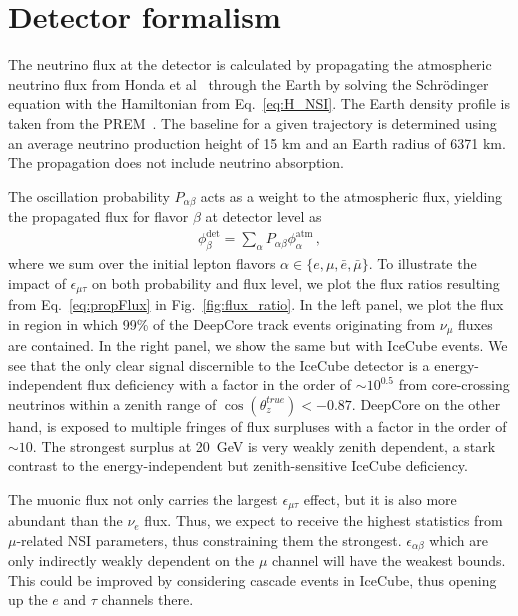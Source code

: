 \documentclass[draft=True]{revtex4-2}
\newcommand{\ztrue}{\ensuremath{\cos{(\theta_z^{true})}}}
\newcommand{\emt}{\ensuremath{\epsilon_{\mu\tau}}}
\renewcommand{\ne}{\nu_e}
\newcommand{\nm}{\nu_\mu}
\begin{document}
\section{Detector formalism}
The neutrino flux at the detector is calculated by propagating the atmospheric neutrino flux from Honda et al~\cite{hondapaper} through the Earth by solving the 
Schrödinger equation with the Hamiltonian from Eq.~\ref{eq:H_NSI}. The Earth density profile is taken from the PREM~\cite{PREM}. The baseline for a given trajectory is determined using an average neutrino
production height of 15 km and an Earth radius of 6371 km. The propagation does not include neutrino absorption.


The oscillation probability $P_{\alpha \beta}$ acts as a weight to the atmospheric flux, yielding the propagated flux for flavor $\beta$ at detector level as 
\begin{align}\label{eq:propFlux}
    \phi_\beta^\text{det} = \sum_\alpha P_{\alpha\beta} \phi_\alpha^\text{atm} \,,
\end{align}
where we sum over the initial lepton flavors $\alpha \in \{e,\mu, \bar{e}, \bar{\mu}\}$. To illustrate the impact of $\emt$ on both probability
and flux level, we plot the flux ratios resulting from Eq.~\ref{eq:propFlux} in Fig.~\ref{fig:flux_ratio}. In the left panel, we plot the flux in region in which 99\% of the 
DeepCore track events originating from $\nm$ fluxes are contained. In the right panel, we show the same but with IceCube events. We see that the only clear signal discernible to the IceCube detector
is a energy-independent flux deficiency with a factor in the order of $\sim 10^{0.5}$ from core-crossing neutrinos within a zenith range of $\ztrue < -0.87$. DeepCore on the other hand, 
is exposed to multiple fringes of flux surpluses with a factor in the order of $\sim 10$. The strongest surplus at \SI{20}{\GeV} is very weakly zenith dependent, a stark contrast to the
energy-independent but zenith-sensitive IceCube deficiency.

The muonic flux not only carries the largest $\emt$ effect, but it is also more abundant than the $\ne$ flux. Thus, we expect to receive the highest statistics from $\mu$-related NSI parameters,
thus constraining them the strongest. $\epsilon_{\alpha\beta}$ which are only indirectly weakly dependent on the $\mu$ channel will have the weakest bounds. This could be improved
by considering cascade events in IceCube, thus opening up the $e$ and $\tau$ channels there.
\end{document}
